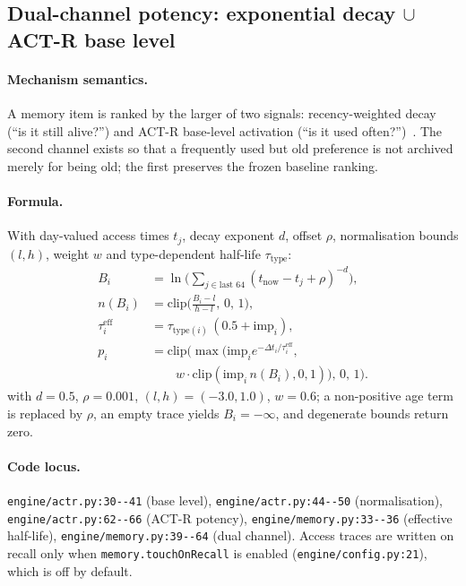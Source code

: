 \subsection{Dual-channel potency: exponential decay $\cup$ ACT-R base level}\label{sec:method:potency}

\paragraph{Mechanism semantics.} A memory item is ranked by the larger of two
signals: recency-weighted decay (``is it still alive?'') and ACT-R base-level
activation (``is it used often?'')~\cite{anderson1991}. The second channel exists
so that a frequently used but old preference is not archived merely for being
old; the first preserves the frozen baseline ranking.

\paragraph{Formula.} With day-valued access times $t_j$, decay exponent $d$,
offset $\rho$, normalisation bounds $(l,h)$, weight $w$ and type-dependent
half-life $\tau_{\mathrm{type}}$:
{\small
\begin{equation}
\begin{aligned}
B_i &= \ln\!\Big(\sum_{j \in \text{last }64} (t_{\mathrm{now}} - t_j + \rho)^{-d}\Big),\\
n(B_i) &= \mathrm{clip}\!\Big(\frac{B_i - l}{h - l},\,0,\,1\Big),\\
\tau_i^{\mathrm{eff}} &= \tau_{\mathrm{type}(i)}\,(0.5 + \mathrm{imp}_i),\\
p_i &= \mathrm{clip}\Big(\max\big(\mathrm{imp}_i e^{-\Delta t_i/\tau_i^{\mathrm{eff}}},\\
&\qquad w \cdot \mathrm{clip}(\mathrm{imp}_i\, n(B_i),0,1)\big),\,0,\,1\Big).
\end{aligned}
\end{equation}
}
with $d=0.5$, $\rho=0.001$, $(l,h)=(-3.0,1.0)$, $w=0.6$; a non-positive age
term is replaced by $\rho$, an empty trace yields $B_i=-\infty$, and degenerate
bounds return zero.

\paragraph{Code locus.} \texttt{engine/\allowbreak{}actr.\allowbreak{}py:\allowbreak{}30-\allowbreak{}-\allowbreak{}41} (base level),
\texttt{engine/\allowbreak{}actr.\allowbreak{}py:\allowbreak{}44-\allowbreak{}-\allowbreak{}50} (normalisation),
\texttt{engine/\allowbreak{}actr.\allowbreak{}py:\allowbreak{}62-\allowbreak{}-\allowbreak{}66} (ACT-R potency),
\texttt{engine/\allowbreak{}memory.\allowbreak{}py:\allowbreak{}33-\allowbreak{}-\allowbreak{}36} (effective half-life),
\texttt{engine/\allowbreak{}memory.\allowbreak{}py:\allowbreak{}39-\allowbreak{}-\allowbreak{}64} (dual channel). Access traces are written on
recall only when \texttt{memory.\allowbreak{}touchOnRecall} is enabled
(\texttt{engine/\allowbreak{}config.\allowbreak{}py:\allowbreak{}21}), which is off by default.

